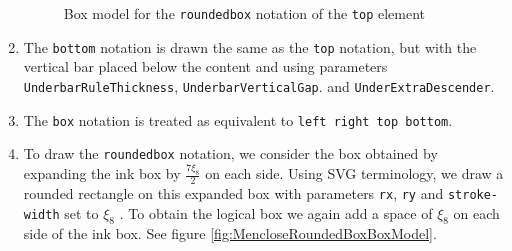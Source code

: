 \begin{enumerate}
  \begin{figure}
\centering
{}
  \caption{Box model for the {\tt roundedbox}
    notation of the {\tt top} element}
\label{fig:MencloseTopBoxModel}
\end{figure}

\item The {\tt bottom} notation is drawn the same as the {\tt top} notation,
  but with the vertical bar placed below the content and using parameters
  {\tt UnderbarRuleThickness},
  {\tt UnderbarVerticalGap}.
  and {\tt UnderExtraDescender}.

\item The {\tt box} notation is treated as equivalent to
  {\tt left right top bottom}.

\item To draw the {\tt roundedbox} notation, we consider the box
  obtained by expanding the ink box by $\frac{7\xi_8}{2}$ on each side.
  Using SVG terminology, we draw a rounded rectangle on this expanded box
  with parameters {\tt rx}, {\tt ry} and {\tt stroke-width} set to $\xi_8$
  \cite{SVG11}. To obtain the logical box we again add a space of $\xi_8$ on
  each side of the ink box. See figure \ref{fig:MencloseRoundedBoxBoxModel}.

  \begin{figure}
\centering
\end{figure}
\end{enumerate}
